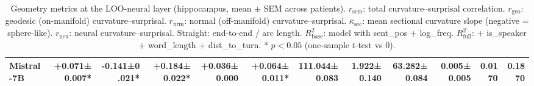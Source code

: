 \begin{table}[t]
\begin{tabular}{lrrrrrrrrrrr}
Mistral-7B & \textbf{+0.071\tiny{±0.007*}} & \textbf{-0.141\tiny{±0.021*}} & +0.184\tiny{±0.022*} & +0.036\tiny{±0.000} & +0.064\tiny{±0.011*} & 111.044\tiny{±0.083} & 1.922\tiny{±0.140} & 63.282\tiny{±0.084} & 0.005\tiny{±0.005} & 0.0170 & 0.1870 \\
\bottomrule
\end{tabular}
\caption{Geometry metrics at the LOO-neural layer (hippocampus, mean $\pm$ SEM across patients). $r_\mathrm{sem}$: total curvature--surprisal correlation. $r_\mathrm{geo}$: geodesic (on-manifold) curvature--surprisal. $r_\mathrm{nrm}$: normal (off-manifold) curvature--surprisal. $\bar\kappa_\mathrm{sec}$: mean sectional curvature slope (negative = sphere-like). $r_\mathrm{neu}$: neural curvature--surprisal. Straight: end-to-end / arc length. $R^2_\mathrm{base}$: model with sent\_pos + log\_freq. $R^2_\mathrm{full}$: + is\_speaker + word\_length + dist\_to\_turn. * $p < 0.05$ (one-sample $t$-test vs 0).}
\label{tab:geometry}
\end{table}